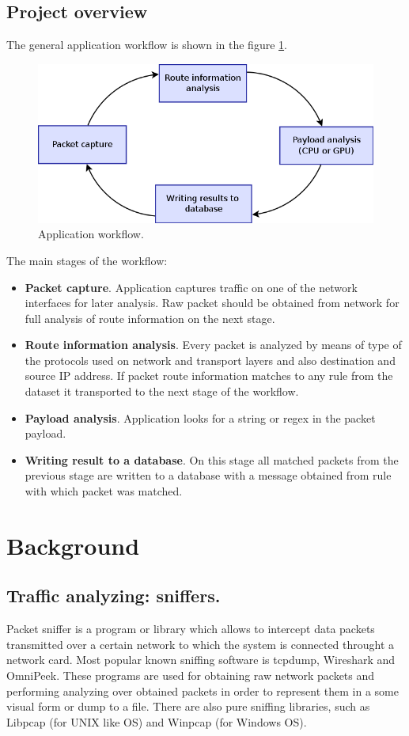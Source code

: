 \documentclass[thesis=M,english]{FITthesis}[2011/07/15]
\begin{document}
\section{Project overview}

The general application workflow is shown in the figure \ref{fig:app_workflow}.
\begin{figure}[h]
\centering
\includegraphics[scale=0.4]{images/workflow.png}
\caption{Application workflow.}
\label{fig:app_workflow}
\end{figure}

The main stages of the workflow:
\begin{itemize}
\item \textbf{Packet capture}. Application captures traffic on one of the network interfaces for later analysis. Raw packet should be obtained from network for full analysis of route information on the next stage.
\item \textbf{Route information analysis}. Every packet is analyzed by means of type of the protocols used on network and transport layers and also destination and source IP address. If packet route information matches to any rule from the dataset it transported to the next stage of the workflow.
\item \textbf{Payload analysis}. Application looks for a string or regex in the packet payload.
\item \textbf{Writing result to a database}. On this stage all matched packets from the previous stage are written to a database with a message obtained from rule with which packet was matched.
\end{itemize}

\chapter{Background}
\section{Traffic analyzing: sniffers.}
Packet sniffer is a program or library which allows to intercept data packets transmitted over a certain network to which the system is connected throught a network card. Most popular known sniffing software is tcpdump, Wireshark and OmniPeek. These programs are used for obtaining raw network packets and performing analyzing over obtained packets in order to represent them in a some visual form or dump to a file. There are also pure sniffing libraries, such as Libpcap (for UNIX like OS) and Winpcap (for Windows OS).
\end{document}

